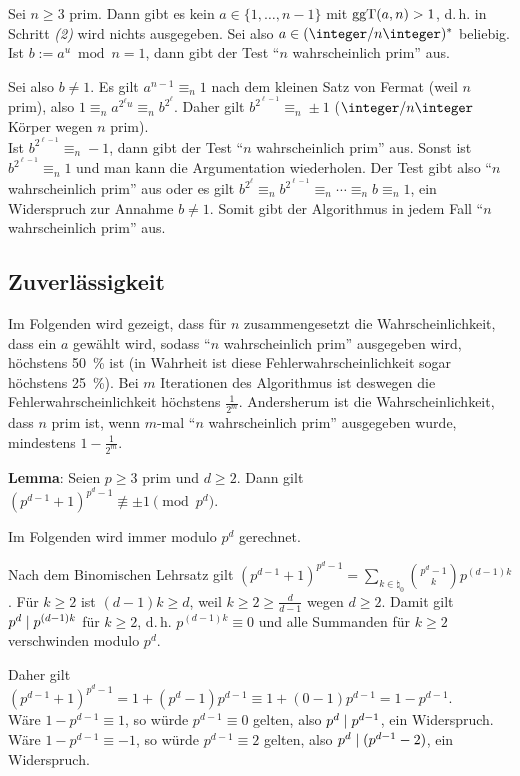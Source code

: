 \begin{Beweis}
    Sei $n \ge 3$ prim.
    Dann gibt es kein $a \in \{1, \dotsc, n - 1\}$ mit $\operatorname{ggT}(a, n) > 1$, d.\,h.
    in Schritt \emph{(2)} wird nichts ausgegeben.
    Sei also $a \in (\ZnZ)^\ast$ beliebig.
    Ist $b := a^u \bmod n = 1$, dann gibt der Test "`$n$ wahrscheinlich prim"' aus.

    Sei also $b \not= 1$.
    Es gilt $a^{n-1} \equiv_n 1$ nach dem kleinen Satz von Fermat (weil $n$ prim),
    also $1 \equiv_n a^{2^\ell u} \equiv_n b^{2^\ell}$.
    Daher gilt $b^{2^{\ell-1}} \equiv_n \pm 1$
    ($\ZnZ$ Körper wegen $n$ prim).\\
    Ist $b^{2^{\ell-1}} \equiv_n -1$, dann gibt der Test "`$n$ wahrscheinlich prim"' aus.
    Sonst ist $b^{2^{\ell-1}} \equiv_n 1$ und man kann die Argumentation wiederholen.
    Der Test gibt also "`$n$ wahrscheinlich prim"' aus oder es gilt
    $b^{2^\ell} \equiv_n b^{2^{\ell-1}} \equiv_n \dotsb \equiv_n b \equiv_n 1$,
    ein Widerspruch zur Annahme $b \not= 1$.
    Somit gibt der Algorithmus in jedem Fall "`$n$ wahrscheinlich prim"' aus.
\end{Beweis}

\subsection{%
    Zuverlässigkeit%
}

Im Folgenden wird gezeigt, dass für $n$ zusammengesetzt die Wahrscheinlichkeit,
dass ein $a$ gewählt wird, sodass "`$n$ wahrscheinlich prim"' ausgegeben wird,
höchstens \SI{50}{\percent} ist
(in Wahrheit ist diese Fehlerwahrscheinlichkeit sogar höchstens \SI{25}{\percent}).
Bei $m$ Iterationen des Algorithmus ist deswegen die Fehlerwahrscheinlichkeit
höchstens $\frac{1}{2^m}$.
Andersherum ist die Wahrscheinlichkeit, dass $n$ prim ist, wenn $m$-mal
"`$n$ wahrscheinlich prim"' ausgegeben wurde, mindestens $1 - \frac{1}{2^m}$.

\linie

\textbf{Lemma}:
Seien $p \ge 3$ prim und $d \ge 2$.
Dann gilt $(p^{d-1} + 1)^{p^d-1} \not\equiv \pm 1 \pmod{p^d}$.

\begin{Beweis}
    Im Folgenden wird immer modulo $p^d$ gerechnet.

    Nach dem Binomischen Lehrsatz gilt
    $(p^{d-1} + 1)^{p^d-1} = \sum_{k \in \natural_0} \binom{p^d - 1}{k} p^{(d-1)k}$.
    Für $k \ge 2$ ist $(d-1)k \ge d$, weil $k \ge 2 \ge \frac{d}{d-1}$ wegen $d \ge 2$.
    Damit gilt $p^d \mid p^{(d-1)k}$ für $k \ge 2$, d.\,h. $p^{(d-1)k} \equiv 0$ und
    alle Summanden für $k \ge 2$ verschwinden modulo $p^d$.

    Daher gilt
    $(p^{d-1} + 1)^{p^d-1} = 1 + (p^d - 1) p^{d-1} \equiv
    1 + (0 - 1)p^{d-1} = 1 - p^{d-1}$.\\
    Wäre $1 - p^{d-1} \equiv 1$, so würde $p^{d-1} \equiv 0$ gelten,
    also $p^d \mid p^{d-1}$, ein Widerspruch.\\
    Wäre $1 - p^{d-1} \equiv -1$, so würde $p^{d-1} \equiv 2$ gelten,
    also $p^d \mid (p^{d-1}-2)$,
    ein Widerspruch.
\end{Beweis}

